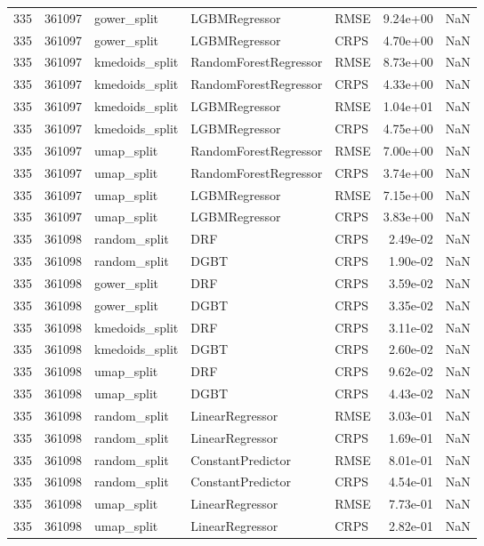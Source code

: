 \begin{tabular}{rrlllrr}
335 & 361097 & gower\_split & LGBMRegressor & RMSE & 9.24e+00 & NaN \\
335 & 361097 & gower\_split & LGBMRegressor & CRPS & 4.70e+00 & NaN \\
335 & 361097 & kmedoids\_split & RandomForestRegressor & RMSE & 8.73e+00 & NaN \\
335 & 361097 & kmedoids\_split & RandomForestRegressor & CRPS & 4.33e+00 & NaN \\
335 & 361097 & kmedoids\_split & LGBMRegressor & RMSE & 1.04e+01 & NaN \\
335 & 361097 & kmedoids\_split & LGBMRegressor & CRPS & 4.75e+00 & NaN \\
335 & 361097 & umap\_split & RandomForestRegressor & RMSE & 7.00e+00 & NaN \\
335 & 361097 & umap\_split & RandomForestRegressor & CRPS & 3.74e+00 & NaN \\
335 & 361097 & umap\_split & LGBMRegressor & RMSE & 7.15e+00 & NaN \\
335 & 361097 & umap\_split & LGBMRegressor & CRPS & 3.83e+00 & NaN \\
335 & 361098 & random\_split & DRF & CRPS & 2.49e-02 & NaN \\
335 & 361098 & random\_split & DGBT & CRPS & 1.90e-02 & NaN \\
335 & 361098 & gower\_split & DRF & CRPS & 3.59e-02 & NaN \\
335 & 361098 & gower\_split & DGBT & CRPS & 3.35e-02 & NaN \\
335 & 361098 & kmedoids\_split & DRF & CRPS & 3.11e-02 & NaN \\
335 & 361098 & kmedoids\_split & DGBT & CRPS & 2.60e-02 & NaN \\
335 & 361098 & umap\_split & DRF & CRPS & 9.62e-02 & NaN \\
335 & 361098 & umap\_split & DGBT & CRPS & 4.43e-02 & NaN \\
335 & 361098 & random\_split & LinearRegressor & RMSE & 3.03e-01 & NaN \\
335 & 361098 & random\_split & LinearRegressor & CRPS & 1.69e-01 & NaN \\
335 & 361098 & random\_split & ConstantPredictor & RMSE & 8.01e-01 & NaN \\
335 & 361098 & random\_split & ConstantPredictor & CRPS & 4.54e-01 & NaN \\
335 & 361098 & umap\_split & LinearRegressor & RMSE & 7.73e-01 & NaN \\
335 & 361098 & umap\_split & LinearRegressor & CRPS & 2.82e-01 & NaN \\

\end{tabular}
